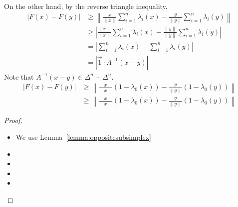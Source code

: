 \documentclass[10pt,a4paper]{article}
\newcommand{\todo}[1]{{\color{RedOrange}\textbf{#1}}}
\begin{document}
On the other hand, by the reverse triangle inequality,
    \begin{align}
        \left| F(x) - F(y) \right|
        &\geq 
        \left\| 
            \frac{x}{\|x\|}
            \sum_{i=1}^{n} \lambda_{i}(x)
            -
            \frac{y}{\|y\|}
            \sum_{i=1}^{n} \lambda_{i}(y)
        \right\|
        \\&
        \geq 
        \left| 
            \frac{\|x\|}{\|x\|}
            \sum_{i=1}^{n} \lambda_{i}(x)
            -
            \frac{\|y\|}{\|y\|}
            \sum_{i=1}^{n} \lambda_{i}(y)
        \right|
        \\&
        = 
        \left| 
            \sum_{i=1}^{n} \lambda_{i}(x)
            -
            \sum_{i=1}^{n} \lambda_{i}(y)
        \right|
        \\&
        = 
        \left| 
            \vec{1}
            \cdot 
            A^{-1}( x - y )
        \right|
    \end{align}
    Note that $A^{-1}( x - y ) \in \Delta^{n} - \Delta^{n}$. 
    \begin{align}
        \left| F(x) - F(y) \right|
        &\geq 
        \left\| 
            \frac{x}{\|x\|}
            \left( 1 - \lambda_{0}(x) \right) 
            -
            \frac{y}{\|y\|}
            \left( 1 - \lambda_{0}(y) \right) 
        \right\|
        \\&
        \geq 
        \left\| 
            \frac{x}{\|x\|}
            \left( 1 - \lambda_{0}(x) \right) 
            -
            \frac{y}{\|y\|}
            \left( 1 - \lambda_{0}(y) \right) 
        \right\|
    \end{align}
    
    
    
    
    
    
    
    
    
    
    \begin{proof}
\begin{itemize}
    \item 
    We use Lemma~\ref{lemma:oppositesubsimplex}
    \item 
    \item 
    \item 
    \item 
\end{itemize}
\end{proof}
\end{document}
